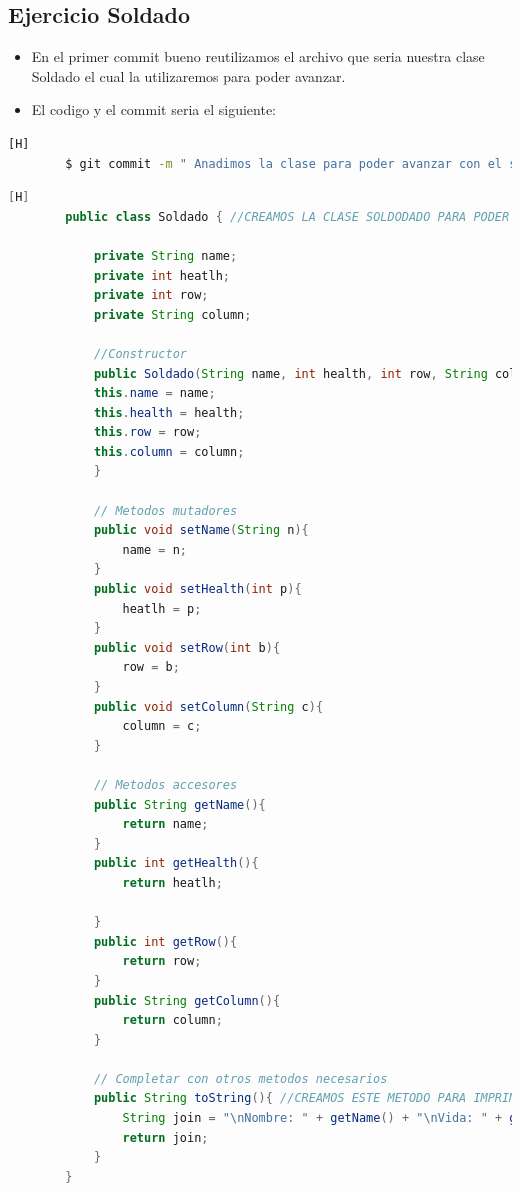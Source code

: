\documentclass{article}
\begin{document}
	\subsection{Ejercicio Soldado}
	\begin{itemize}	
		\item En el primer commit bueno reutilizamos el archivo que seria nuestra clase Soldado el cual la utilizaremos para poder avanzar.
		\item El codigo y el commit seria el siguiente:
	\end{itemize}	
	\begin{lstlisting}[language=bash,caption={Commit}][H]
		$ git commit -m " Anadimos la clase para poder avanzar con el siguiente ejercicio reutilizamos el archivo del laboratorio 5 ya que serian los mismos atributos solo que esta vez lo usaremos con un ArrayList bidimensional"
	\end{lstlisting}	
	\begin{lstlisting}[language=java,caption={Las lineas de codigos del metodo creado:}][H]
		public class Soldado { //CREAMOS LA CLASE SOLDODADO PARA PODER USAR UN ARREGLO BIDIMENSIONAL DONDE NECESITAMOS LA VIDA , EL NOMBRE DEL SOLDADO Y TAMBIEN SU POSICION COMO LA FILA Y LA COLUMNA   

			private String name;
			private int heatlh; 
			private int row;
			private String column;

			//Constructor
			public Soldado(String name, int health, int row, String column){
			this.name = name;
			this.health = health;
			this.row = row;
			this.column = column;
			}

			// Metodos mutadores
			public void setName(String n){
				name = n;
			}
			public void setHealth(int p){
				heatlh = p;
			}
			public void setRow(int b){
				row = b;
			}
			public void setColumn(String c){
				column = c; 
			}

			// Metodos accesores
			public String getName(){
				return name;
			}
			public int getHealth(){
				return heatlh;

			}
			public int getRow(){
				return row;
			}
			public String getColumn(){
				return column;
			}

			// Completar con otros metodos necesarios
			public String toString(){ //CREAMOS ESTE METODO PARA IMPRIMIR LOS DATOS DEl OBJETO
				String join = "\nNombre: " + getName() + "\nVida: " + getHealth() + "\nFila: " + getRow() + "\nColumna: " + getColumn(); //Agregamos un espaciador para poder separar
				return join;
			}
		}
	\end{lstlisting}
\end{document}
